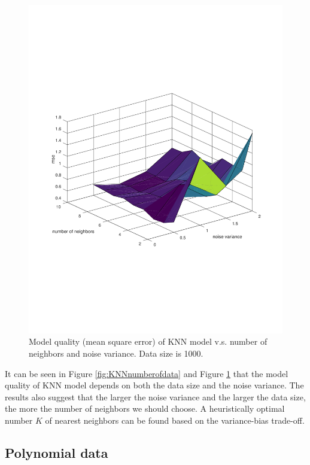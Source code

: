 \documentclass[]{article}
\begin{document}
\begin{figure}[H]
	\centering
	\includegraphics[trim= 10cm 5cm 10cm 5cm, scale=0.4]{proj1-3_1d-noise}
	\caption{Model quality (mean square error) of KNN model v.s. number of neighbors and noise variance. Data size is 1000.}
	\label{fig:KNNnoisevariance}
\end{figure}

It can be seen in Figure \ref{fig:KNNnumberofdata} and Figure \ref{fig:KNNnoisevariance} that the model quality of KNN model depends on both the data size and the noise variance. The results also suggest that the larger the noise variance and the larger the data size, the more the number of neighbors we should choose. A heuristically optimal number $K$ of nearest neighbors can be found based on the variance-bias trade-off. 

\subsection{Polynomial  data}
\end{document}
